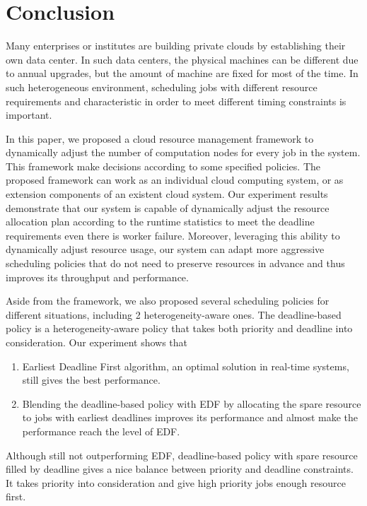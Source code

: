 \chapter{Conclusion}\label{chap:conclusion}

Many enterprises or institutes are building private clouds by
establishing their own data center.
In such data centers, the physical machines can be different due to 
annual upgrades,  but the amount of machine are fixed for most of the 
time.
In such heterogeneous environment, scheduling jobs with different 
resource requirements and characteristic in order to meet different 
timing constraints is important.

In this paper, we proposed a cloud resource management framework to
dynamically adjust the number of computation nodes for every job in the
system.
This framework make decisions according to some specified policies.
The proposed framework can work as an individual cloud computing system,
or as extension components of an existent cloud system.
Our experiment results demonstrate that our system is capable of
dynamically adjust the resource allocation plan according to the runtime
statistics to meet the deadline requirements even there is worker
failure.
Moreover, leveraging this ability to dynamically adjust resource usage,
our system can adapt more aggressive scheduling policies that do not
need to preserve resources in advance and thus improves its throughput
and performance.

Aside from the framework, we also proposed several scheduling policies
for different situations, including 2 heterogeneity-aware ones.
The deadline-based policy is a heterogeneity-aware policy that takes
both priority and deadline into consideration.
Our experiment shows that
\begin{enumerate}
  \item Earliest Deadline First algorithm, an optimal solution in
    real-time systems, still gives the best performance.
  \item Blending the deadline-based policy with EDF by allocating the
    spare resource to jobs with earliest deadlines improves its
    performance and almost make the performance reach the level of EDF.
\end{enumerate}
Although still not outperforming EDF, deadline-based policy with spare
resource filled by deadline gives a nice balance between priority and
deadline constraints.
It takes priority into consideration and give high priority jobs enough
resource first.
